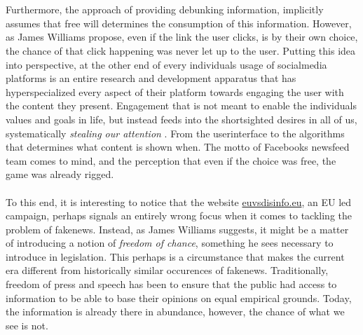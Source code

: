 \documentclass{article}
\begin{document}
\\\\
Furthermore, the approach of providing debunking information, implicitly assumes that free will determines the consumption of this information. However, as James Williams propose, even if the link the user clicks, is by their own choice, the chance of that click happening was never let up to the user. Putting this idea into perspective, at the other end of every individuals usage of socialmedia platforms is an entire research and development apparatus that has hyperspecialized every aspect of their platform towards engaging the user with the content they present. Engagement that is not meant to enable the individuals values and goals in life, but instead feeds into the shortsighted desires in all of us, systematically {\it stealing our attention} \cite{jamesfuckingwilliamseveryone}. From the userinterface to the algorithms that determines what content is shown when. The motto of Facebooks newsfeed team comes to mind, and the perception that even if the choice was free, the game was already rigged.
\\\\
To this end, it is interesting to notice that the website \href{https://euvsdisinfo}{euvsdisinfo.eu}, an EU led campaign, perhaps signals an entirely wrong focus when it comes to tackling the problem of fakenews. Instead, as James Williams suggests, it might be a matter of introducing a notion of {\it freedom of chance}, something he sees necessary to introduce in legislation. This perhaps is a circumstance that makes the current era different from historically similar occurences of fakenews. Traditionally, freedom of press and speech has been to ensure that the public had access to information to be able to base their opinions on equal empirical grounds. Today, the information is already there in abundance, however, the chance of what we see is not.
\end{document}
